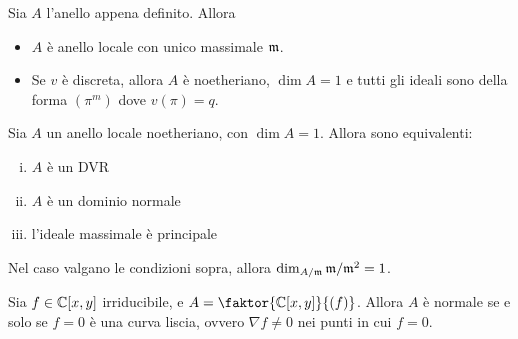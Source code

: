 \begin{proposition}
    Sia $A$ l'anello appena definito. Allora
    \begin{itemize}
        \item $A$ è anello locale con unico massimale $\mathfrak{m}$.
        \item Se $v$ è discreta, allora $A$ è noetheriano, $\dim A=1$ e tutti gli ideali sono della forma $(\pi^m)$ dove $v(\pi)=q$.
    \end{itemize}
\end{proposition}

\begin{theorem}
    Sia $A$ un anello locale noetheriano, con $\dim A=1$. Allora sono equivalenti:
    \begin{enumerate}[i.]
        \item $A$ è un DVR
        \item $A$ è un dominio normale
        \item l'ideale massimale è principale
    \end{enumerate}
\end{theorem}

\begin{oss}
    Nel caso valgano le condizioni sopra, allora $\dim_{A/\mathfrak{m}}\mathfrak{m}/\mathfrak{m}^2=1$.
\end{oss}

\begin{proposition}
    Sia $f\in\mathbb{C}[x,y]$ irriducibile, e $A=\faktor{\C[x,y]}{(f)}$. Allora $A$ è normale se e solo se $f=0$ è una curva liscia, ovvero $\nabla f\neq 0$ nei punti in cui $f=0$.
\end{proposition}


